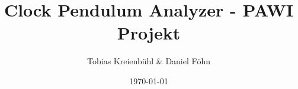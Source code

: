 \documentclass{beamer}
\title{Clock Pendulum Analyzer - PAWI Projekt}
\author{Tobias Kreienbühl \& Daniel Föhn}
\institute{Hochschule Luzern, Informatik}
\date{\today}
\begin{document}
\begin{frame}
	\titlepage
\end{frame}












\end{document}
